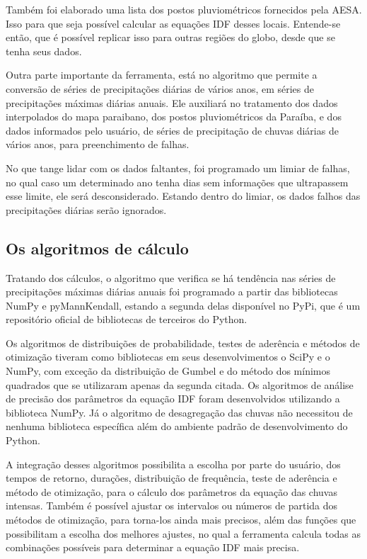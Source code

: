 Também foi elaborado uma lista dos postos pluviométricos fornecidos pela AESA. Isso para que seja possível calcular as equações IDF desses locais. Entende-se então, que é possível replicar isso para outras regiões do globo, desde que se tenha seus dados.

Outra parte importante da ferramenta, está no algoritmo que permite a conversão de séries de precipitações diárias de vários anos, em séries de precipitações máximas diárias anuais. Ele auxiliará no tratamento dos dados interpolados do mapa paraibano, dos postos pluviométricos da Paraíba, e dos dados informados pelo usuário, de séries de precipitação de chuvas diárias de vários anos, para preenchimento de falhas.

No que tange lidar com os dados faltantes, foi programado um limiar de falhas, no qual caso um determinado ano tenha dias sem informações que ultrapassem esse limite, ele será desconsiderado. Estando dentro do limiar, os dados falhos das precipitações diárias serão ignorados.

\subsection{Os algoritmos de cálculo}

Tratando dos cálculos, o algoritmo que verifica se há tendência nas séries de precipitações máximas diárias anuais foi programado a partir das bibliotecas NumPy e pyMannKendall, estando a segunda delas disponível no PyPi, que é um repositório oficial de bibliotecas de terceiros do Python. 

Os algoritmos de distribuições de probabilidade, testes de aderência e métodos de otimização tiveram como bibliotecas em seus desenvolvimentos o SciPy e o NumPy, com exceção da distribuição de Gumbel e do método dos mínimos quadrados que se utilizaram apenas da segunda citada. Os algoritmos de análise de precisão dos parâmetros da equação IDF foram desenvolvidos utilizando a biblioteca NumPy. Já o algoritmo de desagregação das chuvas não necessitou de nenhuma biblioteca específica além do ambiente padrão de desenvolvimento do Python.

A integração desses algoritmos possibilita a escolha por parte do usuário, dos tempos de retorno, durações, distribuição de frequência, teste de aderência e método de otimização, para o cálculo dos parâmetros da equação das chuvas intensas. Também é possível ajustar os intervalos ou números de partida dos métodos de otimização, para torna-los ainda mais precisos, além das funções que possibilitam a escolha dos melhores ajustes, no qual a ferramenta calcula todas as combinações possíveis para determinar a equação IDF mais precisa.

